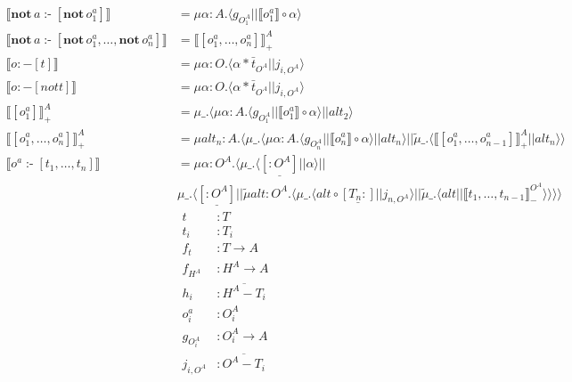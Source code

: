 \documentclass{article}
\begin{document}
\begin{align*}
\llbracket \mathbf{not}\,a \mathbin{\text{:-}} [
  \mathbf{not}\,o_1^a] \rrbracket & = \mu \alpha:A.\langle g_{O_1^A} || \llbracket o_1^a \rrbracket \circ \alpha\rangle \\
\llbracket \mathbf{not}\,a \mathbin{\text{:-}} [
  \mathbf{not}\,o_1^a,
  \dots,
  \mathbf{not}\,o_n^a] \rrbracket &= 
                                    \llbracket [o_1^a,\dots, o_n^a] \rrbracket^A_+ \\
  \llbracket o:-[t]\rrbracket &= \mu \alpha:O.\langle \alpha*\bar{t}_{O^A} || j_{i,O^A}\rangle\\
  \llbracket o:-[not t]\rrbracket &= \mu \alpha:O.\langle \alpha*\bar{t}_{O^A} || j_{i,O^A}\rangle\\
 \llbracket [o_1^a] \rrbracket_+^A &= \mu\_.\langle \mu \alpha:A.\langle g_{O_1^A} || \llbracket o_1^a \rrbracket \circ \alpha\rangle || alt_2\rangle \\
 \llbracket [o_1^a,\dots, o_n^a] \rrbracket_+^A &=  \mu alt_n:A.\langle \mu\_.\langle\mu \alpha:A.\langle g_{O_n^A} || \llbracket o_n^a \rrbracket \circ \alpha\rangle || alt_n \rangle || \tilde\mu\_.\langle \llbracket [o_1^a,\dots, o_{n-1}^a] \rrbracket^A_+ || alt_n \rangle \rangle \\
 \llbracket o^a \mathbin{\text{:-}} [t_1,\dots,t_n] \rrbracket &= \mu\alpha:O^A.\langle \mu\_. \langle \underline{[:O^A]} || \alpha\rangle || \\
 & \mu\_. \langle \underline{[:O^A]} || \tilde\mu alt:O^A. \langle \mu\_. \langle alt \circ \underline{[T_n:]} || j_{n,O^A} \rangle || \tilde\mu\_. \langle alt || \llbracket t_1,\dots,t_{n-1} \rrbracket_-^{O^A}\rangle \rangle \rangle \rangle
\end{align*}
\begin{align*}
  t &: T \\
  t_i &: T_i \\
  f_t &: T \rightarrow A \\
  f_{H^A} &: H^A \rightarrow A \\
  h_i &: \overline{H^A - T_i} \\
  o_i^a &: O_i^A \\
  g_{O_i^A} &: O_i^A \rightarrow A \\
  j_{i,O^A} &: \overline{O^A - T_i}
\end{align*}
\end{document}
